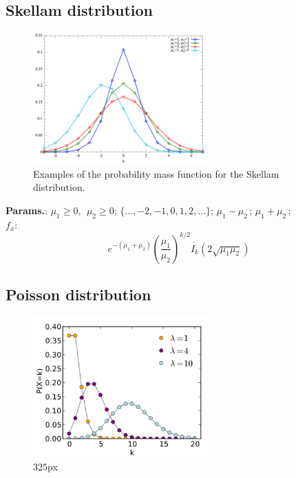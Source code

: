    
        
\subsection{Skellam distribution}


    \begin{figure}[H]
        \centering
        \includegraphics[width=0.6\textwidth]{images/Skellam distribution.png}
        \caption{Examples of the probability mass function for the Skellam distribution.}
    \end{figure}




    {\color{darkblue} \textbf{Params.}:} {$\mu_1\ge 0,~~\mu_2\ge 0$}; {$\{\ldots, -2,-1,0,1,2,\ldots\}$}; {$\mu_1-\mu_2\,$}; {$\mu_1+\mu_2\,$};\hspace{0.5cm}\\{\color{darkblue} \textbf{$f_x$}:} {$$e^{-(\mu_1\!+\!\mu_2)}
\left(\frac{\mu_1}{\mu_2}\right)^{k/2}\!\!I_{k}(2\sqrt{\mu_1\mu_2})$$}



    
        
\subsection{Poisson distribution}


    \begin{figure}[H]
        \centering
        \includegraphics[width=0.6\textwidth]{images/poisson pmf.png}
        \caption{325px}
    \end{figure}




